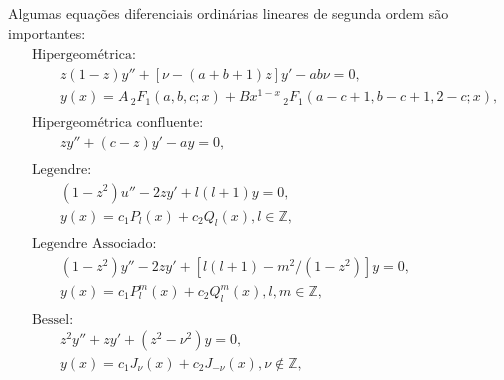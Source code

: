 \documentclass[a4paper,12pt, leqno, answers]{exam}
\begin{document}
Algumas equa\c{c}\~{o}es diferenciais ordin\'{a}rias lineares de segunda ordem s\~{a}o importantes:
\begin{align}
    \begin{split}
        & \text{Hipergeom\'{e}trica:} \\
        & \qquad z (1 - z) y'' + \left[ \nu - \left( a + b + 1 \right) z \right] y' - a b \nu = 0, \\
        & \qquad y(x) = A \,_2F_1(a, b, c; x) + B x^{1 - x} \,_2F_1(a - c + 1, b - c + 1, 2 - c; x), %
    \end{split} \label{eq:hiperg} \\
    \begin{split}
        & \text{Hipergeom\'{e}trica confluente:} \\
        & \qquad z y'' + (c - z) y' - a y = 0,
    \end{split} \label{eq:hiperg_conf} \\
    \begin{split}
        & \text{Legendre:} \\
        & \qquad \left( 1 - z^2 \right) u'' - 2 z y' + l \left( l + 1 \right) y = 0, \\
        & \qquad y(x) = c_1 P_l(x) + c_2 Q_l(x), l \in \mathbb{Z},
    \end{split} \label{eq:legendre} \\
    \begin{split}
        & \text{Legendre Associado:} \\
        & \qquad \left( 1 - z^2 \right) y'' - 2 z y' + \left[ l \left( l + 1 \right) - m^2 / \left( 1 - z^2 \right) \right] y = 0, \\
        & \qquad y(x) = c_1 P_l^m(x) + c_2 Q_l^m(x), l, m \in \mathbb{Z},
    \end{split} \label{eq:legendre_ass} \\
    \begin{split}
        & \text{Bessel:} \\
        & \qquad z^2 y'' + z y' + \left( z^2 - \nu^2 \right) y = 0, \\
        & \qquad y(x) = c_1 J_\nu(x) + c_2 J_{-\nu}(x), \nu \notin \mathbb{Z}, \\

\end{split}
\end{align}
\end{document}
